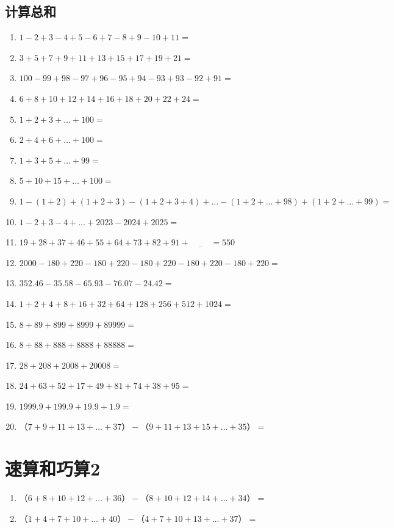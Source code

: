 \documentclass{ctexart}
\begin{document}
\subsection{计算总和}
\begin{enumerate}
	\item $1-2+3-4+5-6+7-8+9-10+11=$

	\item $3+5+7+9+11+13+15+17+19+21=$

	\item $100-99+98-97+96-95+94-93+93-92+91=$

	\item $6+8+10+12+14+16+18+20+22+24=$

	\item $1 + 2 + 3 + \ldots + 100 = $

	\item $2 + 4 +6 + \ldots + 100 = $

	\item $1 + 3 + 5 + \ldots + 99 = $

	\item $5 + 10 + 15 + \ldots + 100 = $

	\item $1 - (1+2) + (1+2+3) - (1+2+3+4) + \ldots - (1+2+\ldots+98) + (1+2+\ldots+99) = $

	\item $1-2+3-4+\ldots+2023-2024+2025=$

	\item $19+28+37+46+55+64+73+82+91+ \underline{\hspace{1cm}}=550$

	\item $2000-180+220-180+220-180+220-180+220-180+220=$

	\item $352.46-35.58-65.93-76.07-24.42=$

	\item $1+2+4+8+16+32+64+128+256+512+1024=$

	\item $8+89+899+8999+89999=$

	\item $8+88+888+8888+88888=$

	\item $28+208+2008+20008=$

	\item $24+63+52+17+49+81+74+38+95=$

	\item $1999.9+199.9+19.9+1.9=$

	\item $（7+9+11+13+\ldots+37）-（9+11+13+15+\ldots+35）=$

\end{enumerate}

\pagebreak
\section{速算和巧算2}

\begin{enumerate}

	\item $（6+8+10+12+\ldots+36）-（8+10+12+14+\ldots+34）=$

	\item $（1+4+7+10+\ldots+40）-（4+7+10+13+\ldots+37）=$
\end{enumerate}
\end{document}
